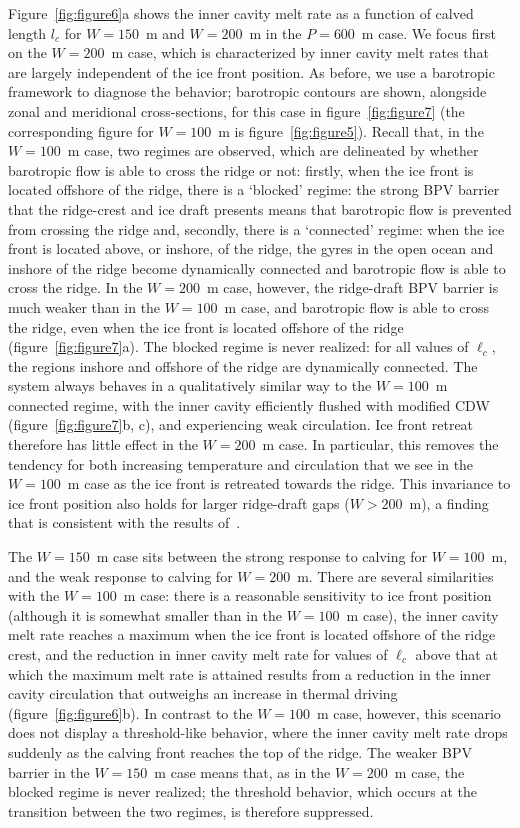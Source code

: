\documentclass[draft]{agujournal2019}
\begin{document}
Figure~\ref{fig:figure6}a shows the inner cavity melt rate as a function of calved length $l_c$ for $W=150$~m and $W=200$~m in the $P = 600$~m case. We focus first on the $W = 200$~m case, which is characterized by inner cavity melt rates that are largely independent of the ice front position. As before, we use a barotropic framework to diagnose the behavior; barotropic contours are shown, alongside zonal and meridional cross-sections, for this case in  figure~\ref{fig:figure7} (the corresponding figure for $W = 100$~m is figure~\ref{fig:figure5}). Recall that, in the $W=100$~m case, two regimes are observed, which are delineated by whether barotropic flow is able to cross the ridge or not: firstly, when the ice front is located offshore of the ridge, there is a `blocked' regime: the strong BPV barrier that the ridge-crest and ice draft presents means that barotropic flow is prevented from crossing the ridge and, secondly, there is a `connected' regime: when the ice front is located above, or inshore, of the ridge, the gyres in the open ocean and inshore of the ridge become dynamically connected and barotropic flow is able to cross the ridge. In the $W=200$~m case, however, the ridge-draft BPV barrier is much weaker than in the $W=100$~m case, and barotropic flow is able to cross the ridge, even when the ice front is located offshore of the ridge (figure~\ref{fig:figure7}a). The blocked regime is never realized: for all values of $\ell_c$, the regions inshore and offshore of the ridge are dynamically connected. The system always behaves in a qualitatively similar way to the $W = 100$~m connected regime, with the inner cavity efficiently flushed with modified CDW (figure~\ref{fig:figure7}b, c), and experiencing weak circulation. Ice front retreat therefore has little effect in the $W = 200$~m case. In particular, this removes the tendency for both increasing temperature and circulation that we see in the $W=100$~m case as the ice front is retreated towards the ridge. This invariance to ice front position also holds for larger ridge-draft gaps ($W>200$~m), a finding that is consistent with the results of~.

The $W = 150$~m case sits between the strong response to calving for $W = 100$~m, and the weak response to calving for $W = 200$~m. There are several similarities with the $W = 100$~m case: there is a reasonable sensitivity to ice front position (although it is somewhat smaller than in the $W = 100$~m case), the inner cavity melt rate reaches a maximum when the ice front is located offshore of the ridge crest, and the reduction in inner cavity melt rate for values of $\ell_c$ above that at which the maximum melt rate is attained results from a reduction in the inner cavity circulation that outweighs an increase in thermal driving (figure~\ref{fig:figure6}b). In contrast to the $W = 100$~m case, however, this scenario does not display a threshold-like behavior, where the inner cavity melt rate drops suddenly as the calving front reaches the top of the ridge. The weaker BPV barrier in the $W=150$~m case means that, as in the $W = 200$~m case, the blocked regime is never realized; the threshold behavior, which occurs at the transition between the two regimes, is therefore suppressed.
\end{document}
